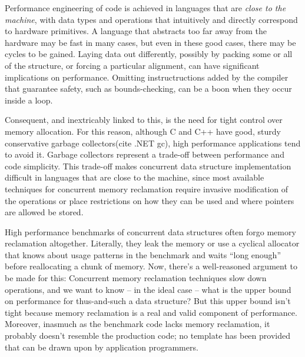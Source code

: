 Performance engineering of code is achieved in languages that are \textit{close to the machine},\cite{Ritchie} with data types and operations that intuitively and directly correspond to hardware primitives.  A language that abstracts too far away from the hardware may be fast in many cases, but even in these good cases, there may be cycles to be gained.  Laying data out differently, possibly by packing some or all of the structure, or forcing a particular alignment, can have significant implications on performance.  Omitting instructructions added by the compiler that guarantee safety, such as bounds-checking, can be a boon when they occur inside a loop.

Consequent, and inextricably linked to this, is the need for tight control over memory allocation.  For this reason, although C and C++ have good, sturdy conservative garbage collectors\cite{BDW}(cite .NET gc), high performance applications tend to avoid it.  Garbage collectors represent a trade-off between performance and code simplicity.  This trade-off makes concurrent data structure implementation difficult in languages that are close to the machine, since most available techniques for concurrent memory reclamation require invasive modification of the operations or place restrictions on how they can be used and where pointers are allowed be stored.\cite{HP}\cite{DTA}\cite{StackTrack}\cite{Threadscan}

High performance benchmarks of concurrent data structures often forgo memory reclamation altogether.\cite{Synchrobench}\cite{Scal}  Literally, they leak the memory or use a cyclical allocator that knows about usage patterns in the benchmark and waits ``long enough'' before reallocating a chunk of memory.  Now, there's a well-reasoned argument to be made for this: Concurrent memory reclamation techniques slow down operations, and we want to know -- in the ideal case -- what is the upper bound on performance for thus-and-such a data structure?  But this upper bound isn't tight because memory reclamation is a real and valid component of performance.  Moreover, inasmuch as the benchmark code lacks memory reclamation, it probably doesn't resemble the production code; no template has been provided that can be drawn upon by application programmers.

